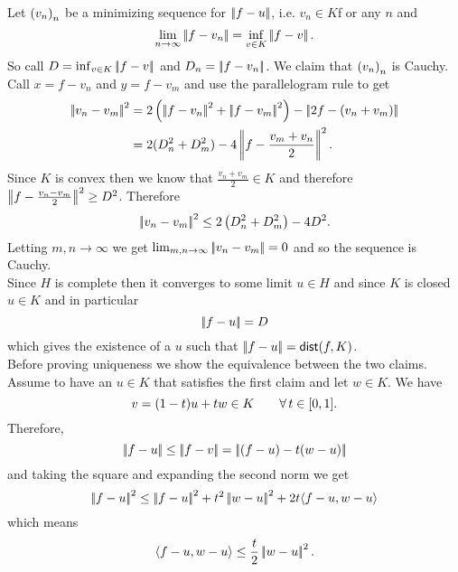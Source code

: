 \documentclass{article}
\begin{document}
\begin{fancyproof}
	Let ${\left({v}_{n}\right)}_{n}$ be a minimizing sequence for $\left|\negthinspace\left|f-u\right|\negthinspace\right|$, i.e. $v_{n}\in K$f or any $n$ and
	\begin{equation*}
		\lim_{n\to\infty}\left|\negthinspace\left|f-v_{n}\right|\negthinspace\right|=\inf_{v\in K}\left|\negthinspace\left|f-v\right|\negthinspace\right|.
	\end{equation*}
	So call $D=\inf_{v\in K}\left|\negthinspace\left|f-v\right|\negthinspace\right|$ and $D_{n}=\left|\negthinspace\left|f-v_{n}\right|\negthinspace\right|$. We claim that ${\left({v}_{n}\right)}_{n}$ is Cauchy. Call $x=f-v_{n}$ and $y=f-v_{m}$ and use the parallelogram rule to get
	\begin{align*}
		\norm{v_{n}-v_{m}}^{2}&=2\left(\norm{f-v_{n}}^{2}+\norm{f-v_{m}}^{2}\right)-\norm{2f-(v_{n}+v_{m})}\\
		&=2(D_{n}^{2}+D_{m}^{2})-4\norm{f-\frac{v_{m}+v_{n}}{2}}^{2}.
	\end{align*}
	Since $K$ is convex then we know that $\frac{v_{n}+v_{m}}{2}\in K$ and therefore $\left|\negthinspace\left|f-\frac{v_{n}-v_{m}}{2}\right|\negthinspace\right|^{2}\geq D^{2}$. Therefore
	\begin{equation*}
		\left|\negthinspace\left|v_{n}-v_{m}\right|\negthinspace\right|^{2}\leq 2\left(D_{n}^{2}+D_{m}^{2}\right)-4D^{2}.
	\end{equation*}
	Letting $m,n\to\infty$ we get $\lim_{m,n\to\infty}\left|\negthinspace\left|v_{n}-v_{m}\right|\negthinspace\right|=0$ and so the sequence is Cauchy.\\
	Since $H$ is complete then it converges to some limit $u\in H$ and since $K$ is closed $u\in K$ and in particular \\
	\begin{equation*}
		\left|\negthinspace\left|f-u\right|\negthinspace\right|=D
	\end{equation*}
	which gives the existence of a $u$ such that $\left|\negthinspace\left|f-u\right|\negthinspace\right|=\mathsf{dist}(f,K)$. \\
	Before proving uniqueness we show the equivalence between the two claims. Assume to have an $u\in K$ that satisfies the first claim and let $w\in K$. We have
	\begin{equation*}
		v=(1-t)u+tw\in K\qquad\forall\, t\in[0,1].
	\end{equation*}
	Therefore,
	\begin{equation*}
		\left|\negthinspace\left|f-u\right|\negthinspace\right|\leq\left|\negthinspace\left|f-v\right|\negthinspace\right|=\left|\negthinspace\left|(f-u)-t(w-u)\right|\negthinspace\right|
	\end{equation*}
	and taking the square and expanding the second norm we get
	\begin{equation*}
		\left|\negthinspace\left|f-u\right|\negthinspace\right|^{2}\leq\left|\negthinspace\left|f-u\right|\negthinspace\right|^{2}+t^{2}\left|\negthinspace\left|w-u\right|\negthinspace\right|^{2}+2t\langle f-u,w-u \rangle
	\end{equation*}
	which means
	\begin{equation*}
		\langle f-u,w-u \rangle\leq\frac{t}{2}\left|\negthinspace\left|w-u\right|\negthinspace\right|^{2}.
	\end{equation*}

\end{fancyproof}
\end{document}
